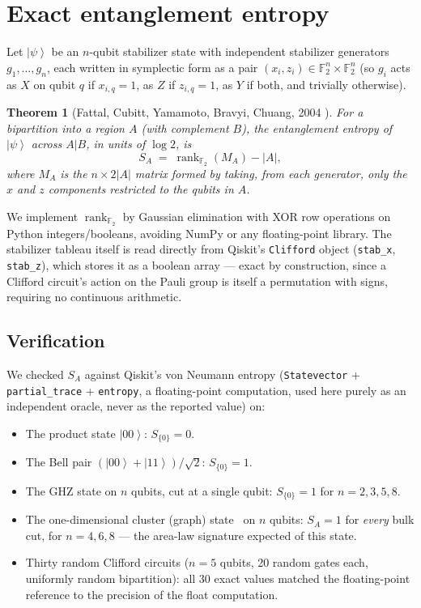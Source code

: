 \documentclass[11pt]{article}
\newtheorem{theorem}{Theorem}
\newcommand{\GF}{\mathbb{F}_2}
\newcommand{\ket}[1]{\left|#1\right\rangle}
\begin{document}
\section{Exact entanglement entropy}

Let $\ket{\psi}$ be an $n$-qubit stabilizer state with independent
stabilizer generators $g_1, \ldots, g_n$, each written in symplectic
form as a pair $(x_i, z_i) \in \GF^n \times \GF^n$ (so $g_i$ acts as $X$
on qubit $q$ if $x_{i,q}=1$, as $Z$ if $z_{i,q}=1$, as $Y$ if both, and
trivially otherwise).

\begin{theorem}[Fattal, Cubitt, Yamamoto, Bravyi, Chuang, 2004
\cite{Fattal2004}]
For a bipartition into a region $A$ (with complement $B$), the
entanglement entropy of $\ket{\psi}$ across $A|B$, in units of $\log 2$,
is
\[
  S_A \;=\; \operatorname{rank}_{\GF}(M_A) - |A|,
\]
where $M_A$ is the $n \times 2|A|$ matrix formed by taking, from each
generator, only the $x$ and $z$ components restricted to the qubits in
$A$.
\end{theorem}

We implement $\operatorname{rank}_{\GF}$ by Gaussian elimination with
XOR row operations on Python integers/booleans, avoiding NumPy or any
floating-point library. The stabilizer tableau itself is read directly
from Qiskit's \texttt{Clifford} object (\texttt{stab\_x}, \texttt{stab\_z}),
which stores it as a boolean array --- exact by construction, since a
Clifford circuit's action on the Pauli group is itself a permutation
with signs, requiring no continuous arithmetic.

\subsection{Verification}

We checked $S_A$ against Qiskit's von Neumann entropy
(\texttt{Statevector} + \texttt{partial\_trace} + \texttt{entropy}, a
floating-point computation, used here purely as an independent oracle,
never as the reported value) on:

\begin{itemize}
\item The product state $\ket{00}$: $S_{\{0\}} = 0$.
\item The Bell pair $(\ket{00}+\ket{11})/\sqrt2$: $S_{\{0\}} = 1$.
\item The GHZ state on $n$ qubits, cut at a single qubit: $S_{\{0\}} =
  1$ for $n = 2,3,5,8$.
\item The one-dimensional cluster (graph) state~\cite{Briegel2001} on $n$ qubits: $S_A = 1$
  for \emph{every} bulk cut, for $n = 4, 6, 8$ --- the area-law
  signature expected of this state.
\item Thirty random Clifford circuits ($n=5$ qubits, 20 random gates
  each, uniformly random bipartition): all 30 exact values matched the
  floating-point reference to the precision of the float computation.
\end{itemize}
\end{document}
